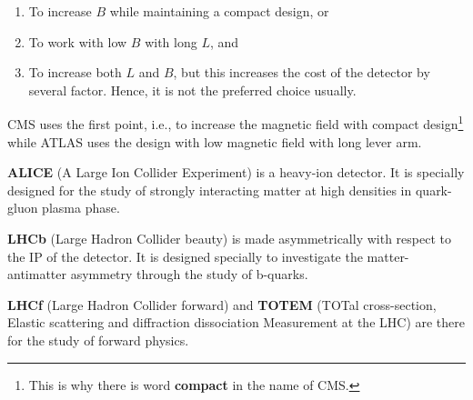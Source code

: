 {{{\begin{enumerate}
	\item To increase $B$ while maintaining a compact design, or
	\item To work with low $B$ with long $L$, and
	\item To increase both $L$ and $B$, but this increases the cost of the detector by several factor. Hence, it is not the preferred choice usually.
\end{enumerate}

CMS uses the first point, i.e., to increase the magnetic field with compact design\footnote{This is why there is word {\bf compact} in the name of CMS.} while ATLAS uses the design with low magnetic field with long lever arm.


{\bf ALICE} (A Large Ion Collider Experiment) is a heavy-ion detector. It is specially designed for the study of strongly interacting matter at high densities in quark-gluon plasma phase.

{\bf LHCb} (Large Hadron Collider beauty) is made asymmetrically with respect to the IP of the detector. It is designed specially to investigate the matter-antimatter asymmetry through the study of b-quarks.

{\bf LHCf} (Large Hadron Collider forward) and {\bf TOTEM} (TOTal cross-section, Elastic scattering and diffraction dissociation Measurement at the LHC) are there for the study of forward physics.

}}}
